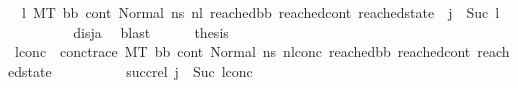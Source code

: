 \begin{isabellebody}
\ {\isachardoublequoteopen}{\isacharparenleft}{\kern0pt}{\isasymexists}\ l{}{\isachardot}{\kern0pt}\ {\isacharparenleft}{\kern0pt}M{\isacharcomma}{\kern0pt}{\isasymLambda}{\isacharcomma}{\kern0pt}{\isasymGamma}{\isacharcomma}{\kern0pt}{\isasymOmega}{\isacharcomma}{\kern0pt}T\ {\isasymturnstile}{\isacharparenleft}{\kern0pt}bb{\isacharcomma}{\kern0pt}\ cont{}{\isacharcomma}{\kern0pt}\ Normal\ ns{}{\isacharprime}{\kern0pt}{\isacharprime}{\kern0pt}{\isacharparenright}{\kern0pt}\ {\isacharminus}{\kern0pt}n{\isasymlongrightarrow}{\isacharcircum}{\kern0pt}l{}\ {\isacharparenleft}{\kern0pt}reached{\isacharunderscore}{\kern0pt}bb{\isacharcomma}{\kern0pt}\ reached{\isacharunderscore}{\kern0pt}cont{\isacharcomma}{\kern0pt}\ reached{\isacharunderscore}{\kern0pt}state{\isacharparenright}{\kern0pt}{\isacharparenright}{\kern0pt}\ {\isasymand}\ {\isacharparenleft}{\kern0pt}j{\isacharprime}{\kern0pt}\ {\isacharequal}{\kern0pt}\ Suc\ l{}{\isacharparenright}{\kern0pt}\ {\isacharparenright}{\kern0pt}{\isachardoublequoteclose}\ \isanewline
\ \ \ \ \ \ \isamarkupfalse%
\ disj{\isacharunderscore}{\kern0pt}a\ \isamarkupfalse%
\ blast\isanewline
\ \ \ \ \isamarkupfalse%
\ {\isacharquery}{\kern0pt}thesis\isanewline
\ \ \ \ \isamarkupfalse%
\ {\isacharminus}{\kern0pt}\isanewline
\ \ \ \ \ \ \isamarkupfalse%
\ l{}{\isacharunderscore}{\kern0pt}conc\ \ conc{\isacharunderscore}{\kern0pt}trace{\isacharcolon}{\kern0pt}\ {\isachardoublequoteopen}{\isacharparenleft}{\kern0pt}M{\isacharcomma}{\kern0pt}{\isasymLambda}{\isacharcomma}{\kern0pt}{\isasymGamma}{\isacharcomma}{\kern0pt}{\isasymOmega}{\isacharcomma}{\kern0pt}T\ {\isasymturnstile}{\isacharparenleft}{\kern0pt}bb{\isacharcomma}{\kern0pt}\ cont{}{\isacharcomma}{\kern0pt}\ Normal\ ns{}{\isacharprime}{\kern0pt}{\isacharprime}{\kern0pt}{\isacharparenright}{\kern0pt}\ {\isacharminus}{\kern0pt}n{\isasymlongrightarrow}{\isacharcircum}{\kern0pt}l{}{\isacharunderscore}{\kern0pt}conc\ {\isacharparenleft}{\kern0pt}reached{\isacharunderscore}{\kern0pt}bb{\isacharcomma}{\kern0pt}\ reached{\isacharunderscore}{\kern0pt}cont{\isacharcomma}{\kern0pt}\ reached{\isacharunderscore}{\kern0pt}state{\isacharparenright}{\kern0pt}{\isacharparenright}{\kern0pt}{\isachardoublequoteclose}\ \ \isanewline
\ \ \ \ \ \ \ \ succ{\isacharunderscore}{\kern0pt}rel{\isacharcolon}{\kern0pt}\ {\isachardoublequoteopen}{\isacharparenleft}{\kern0pt}j{\isacharprime}{\kern0pt}\ {\isacharequal}{\kern0pt}\ Suc\ l{}{\isacharunderscore}{\kern0pt}conc{\isacharparenright}{\kern0pt}{\isachardoublequoteclose}\isanewline

\end{isabellebody}
